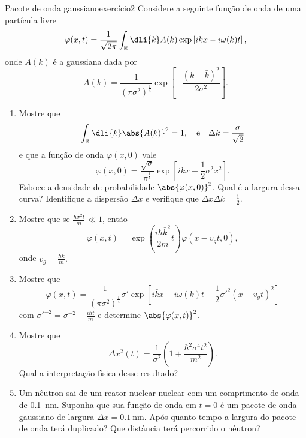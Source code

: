 \begin{exercício}{Pacote de onda gaussiano}{exercício2}
    Considere a seguinte função de onda de uma partícula livre
    \begin{equation*}
        \varphi(x,t) = \frac{1}{\sqrt{2\pi}} \int_{\mathbb{R}} \dli{k} A(k) \exp\left[ikx - i\omega(k) t\right],
    \end{equation*}
    onde \(A(k)\) é a gaussiana dada por
    \begin{equation*}
        A(k) = \frac{1}{(\pi \sigma^2)^{\frac14}} \exp\left[-\frac{(k - \bar{k})^2}{2 \sigma^2}\right].
    \end{equation*}
    \begin{enumerate}[label=(\alph*)]
        \item Mostre que
            \begin{equation*}
                \int_{\mathbb{R}} \dli{k} \abs{A(k)}^2 = 1, \quad\text{e}\quad \Delta k = \frac{\sigma}{\sqrt{2}}
            \end{equation*}
            e que a função de onda \(\varphi(x,0)\) vale
            \begin{equation*}
                \varphi(x,0) = \frac{\sqrt{\sigma}}{\pi^{\frac14}}\exp\left[i \bar{k} x - \frac12 \sigma^2 x^2\right].
            \end{equation*}
            Esboce a densidade de probabilidade \(\abs{\varphi(x,0)}^2\). Qual é a largura dessa curva? Identifique a dispersão \(\Delta x\) e verifique que \(\Delta x \Delta k = \frac12\).
        \item Mostre que se \(\frac{\hbar \sigma^2 t}{m} \ll 1\), então
            \begin{equation*}
                \varphi(x,t) = \exp\left(\frac{i\hbar \bar{k}^2}{2m}t\right)\varphi(x - v_gt, 0),
            \end{equation*}
            onde \(v_g = \frac{\hbar \bar{k}}{m}.\)
        \item Mostre que
            \begin{equation*}
                \varphi(x,t) = \frac{1}{(\pi \sigma^2)^{\frac14}} \sigma'\exp\left[i\bar{k}x - i \omega(k) t  - \frac12 \sigma'^2 (x - v_gt)^2\right]
            \end{equation*}
            com \(\sigma'^{-2} = \sigma^{-2} + \frac{i \hbar t}{m}\) e determine \(\abs{\varphi(x,t)}^2\).
        \item Mostre que
            \begin{equation*}
                \Delta x^2(t) = \frac{1}{\sigma^2}\left(1 + \frac{\hbar^2 \sigma^4 t^2}{m^2}\right).
            \end{equation*}
            Qual a interpretação física desse resultado?
        \item Um nêutron sai de um reator nuclear nuclear com um comprimento de onda de \SI{0.1}{\nano\meter}. Suponha que sua função de onda em \(t = 0\) é um pacote de onda gaussiano de largura \(\Delta x = \SI{0.1}{\nano\meter}.\) Após quanto tempo a largura do pacote de onda terá duplicado? Que distância terá percorrido o nêutron?
    \end{enumerate}
\end{exercício}
